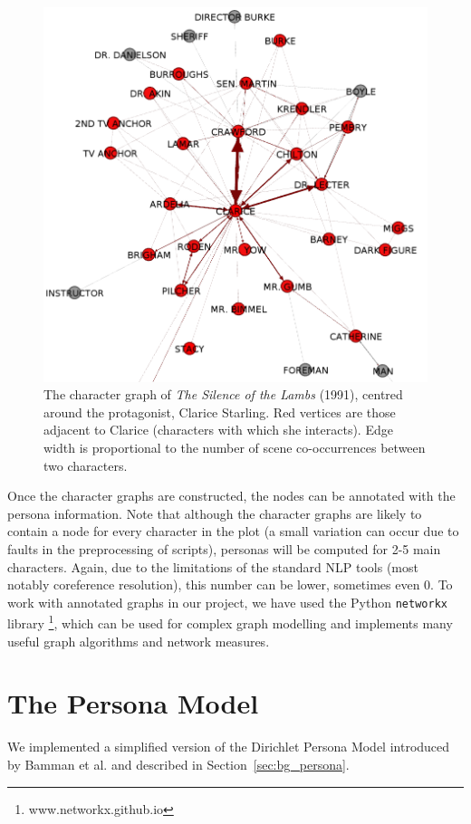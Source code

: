 \documentclass[bsc,frontabs,singlespacing,parskip, twoside]{infthesis}
\begin{document}
\begin{figure}
	\centering
	\includegraphics[scale=0.4]{figures/clarice_graph}
	\caption{The character graph of \textit{The Silence of the Lambs} (1991), centred around the protagonist, Clarice Starling. Red vertices are those adjacent to Clarice (characters with which she interacts). Edge width is proportional to the number of scene co-occurrences between two characters.}
\end{figure}

Once the character graphs are constructed, the nodes can be annotated with the persona information. Note that although the character graphs are likely to contain a node for every character in the plot (a small variation can occur due to faults in the preprocessing of scripts), personas will be computed for 2-5 main characters. Again, due to the limitations of the standard NLP tools (most notably coreference resolution), this number can be lower, sometimes even 0. To work with annotated graphs in our project, we have used the Python \texttt{networkx} library \footnote{www.networkx.github.io}, which can be used for complex graph modelling and implements many useful graph algorithms and network measures.


\section{The Persona Model}
\label{sec:persona_impl}
We implemented a simplified version of the Dirichlet Persona Model introduced by Bamman et al. \cite{Bamman2013} and described in Section~\ref{sec:bg_persona}. 
\end{document}
